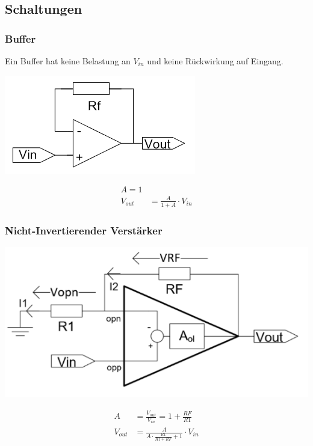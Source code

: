 \subsection{Schaltungen}
\subsubsection{Buffer}
Ein Buffer hat keine Belastung an $V_{in}$ und keine Rückwirkung auf Eingang.\\
\begin{minipage}{0.25\textwidth}
	\includegraphics[width=\linewidth,keepaspectratio=true]{./Images/opamp_buffer}
\end{minipage}%
\begin{minipage}{0.25\textwidth}
	\begin{align*}
		A = 1\\
		V_{out} &= \frac{A}{1 + A}\cdot V_{in}
	\end{align*}
\end{minipage}

\subsubsection{Nicht-Invertierender Verstärker}
\begin{minipage}{0.25\textwidth}
	\includegraphics[width=\linewidth,keepaspectratio=true]{./Images/opamp_negatives_feedback}
\end{minipage}%
\begin{minipage}{0.25\textwidth}
	\begin{align*}
		A &= \frac{V_{out}}{V_{in}} = 1 + \frac{RF}{R1} \\
		V_{out} &= \frac{A}{A \cdot \frac{R1}{R1 + RF} + 1} \cdot V_{in}
	\end{align*}
\end{minipage}

